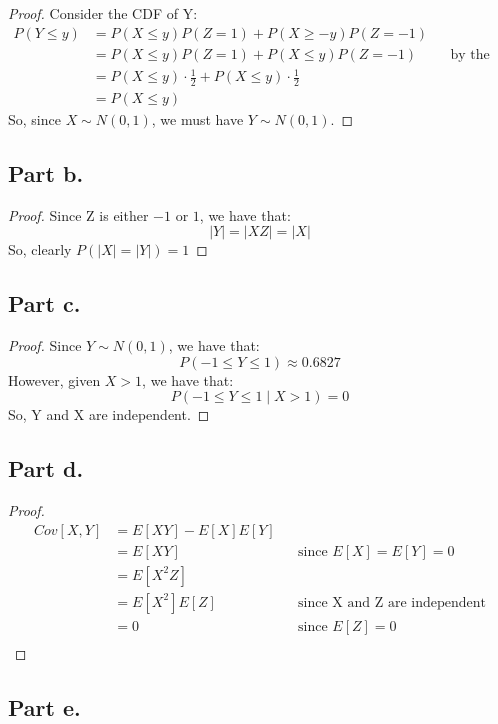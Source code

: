 \documentclass{article}
\begin{document}
\begin{proof}
Consider the CDF of Y:
\begin{align*}
P(Y \leq  y) &= P(X \leq y)P(Z = 1) + P(X \geq - y)P(Z = -1) \\
&= P(X \leq y)P(Z = 1) + P(X \leq y)P(Z = -1) &&\text{by the symmetry of the normal distribution}\\
&= P(X \leq y) \cdot \frac{1}{2} + P(X \leq y) \cdot \frac{1}{2} \\
&= P(X \leq y)
\end{align*}
So, since $X \sim N(0, 1)$, we must have $Y \sim N(0, 1)$.
\end{proof}

\subsection*{Part b.}

\begin{proof}
Since Z is either $-1$ or $1$, we have that:
$$|Y| = |XZ| = |X|$$
So, clearly $P(|X| = |Y|) = 1$
\end{proof}

\subsection*{Part c.}

\begin{proof}
Since $Y \sim N(0, 1)$, we have that:
$$P(-1 \leq Y \leq 1) \approx 0.6827$$
However, given $X > 1$, we have that:
$$P(-1 \leq Y \leq 1 \mid X > 1) = 0$$
So, Y and X are independent.
\end{proof}

\subsection*{Part d.}
\begin{proof}
\begin{align*}
Cov[X, Y] &= E[XY] - E[X]E[Y] \\
&= E[XY] &&\text{since $E[X] = E[Y] = 0$} \\
&= E[X^2Z] \\
&= E[X^2]E[Z] &&\text{since X and Z are independent} \\
&= 0 &&\text{since $E[Z] = 0$}\\
\end{align*}
\end{proof}

\subsection*{Part e.}
\end{document}
